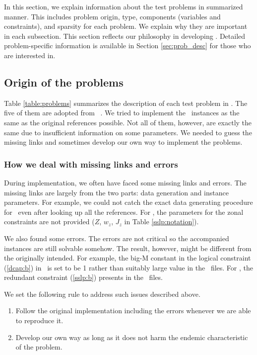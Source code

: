 In this section, we explain information about the test problems in summarized manner. This includes problem origin, type, components (variables and constraints), and sparsity for each problem. We explain why they are important in each subsection. This section reflects our philosophy in developing \siplibtwo. Detailed problem-specific information is available in Section \ref{sec:prob_desc} for those who are interested in.

\subsection{Origin of the problems}
Table \ref{table:problems} summarizes the description of each test problem in \siplibtwo. The five of them are adopted from \siplib\ \cite{web:SIPLIB1}. We tried to implement the \siplib\ instances as the same as the original references possible. Not all of them, however, are exactly the same due to insufficient information on some parameters. We needed to guess the missing links and sometimes develop our own way to implement the problems. 


\subsubsection{How we deal with missing links and errors}
During implementation, we often have faced some missing links and errors. The missing links are largely from the two parts: data generation and instance parameters. For example, we could not catch the exact data generating procedure for \mptsps\ even after looking up all the references. For \sslp, the parameters for the zonal constraints are not provided ($Z$, $w_z$, $J_z$ in Table \ref{sslp:notation}). 

We also found some errors. The errors are not critical so the accompanied instances are still solvable somehow. The result, however, might be different from the originally intended. For example, the big-M constant in the logical constraint (\ref{dcap:b}) in \dcap\ is set to be 1 rather than suitably large value in the \smps\ files. For \sslp, the redundant constraint (\ref{sslp:b}) presents in the \smps\ files. 

We set the following rule to address such issues described above.
\begin{enumerate}
	\item Follow the original implementation including the errors whenever we are able to reproduce it.
	\item Develop our own way as long as it does not harm the endemic characteristic of the problem.
\end{enumerate}

